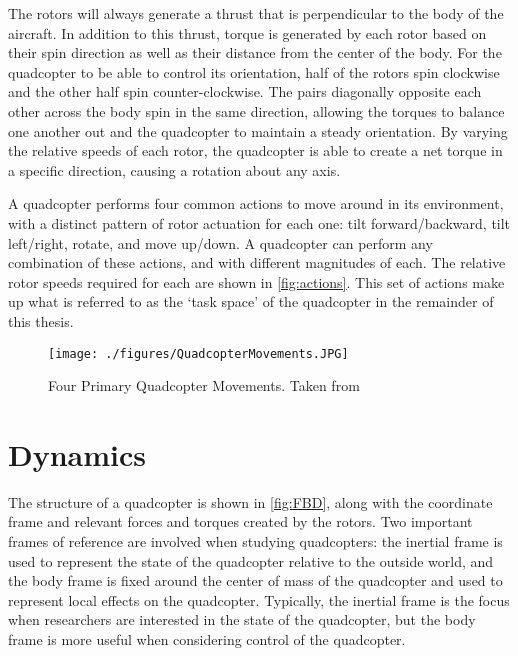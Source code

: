 \documentclass[letterpaper,12pt,titlepage,oneside,final]{book}
\begin{document}
The rotors will always generate a thrust that is perpendicular to the body of the aircraft. 
In addition to this thrust, torque is generated by each rotor based on their spin direction  as well as their distance from the center of the body.
For the quadcopter to be able to control its orientation, half of the rotors spin clockwise and the other half spin counter-clockwise. 
The pairs diagonally opposite each other across the body spin in the same direction, allowing the torques to balance one another out and the quadcopter to maintain a steady orientation. 
By varying the relative speeds of each rotor, the quadcopter is able to create a net torque in a specific direction, causing a rotation about any axis.

A quadcopter performs four common actions to move around in its environment, with a distinct pattern of rotor actuation for each one: 
tilt forward/backward, tilt left/right, rotate, and move up/down. 
A quadcopter can perform any combination of these actions, and with different magnitudes of each. The relative rotor speeds required for each are shown in \autoref{fig:actions}. This set of actions make up what is referred to as the `task space' of the quadcopter in the remainder of this thesis.

\begin{figure}
\centering
\texttt{[image: ./figures/QuadcopterMovements.JPG]}
\caption{Four Primary Quadcopter Movements. Taken from \cite{harsha}}
\label{fig:actions}
\end{figure}


\section{Dynamics} \label{sec:dynamics}


The structure of a quadcopter is shown in \autoref{fig:FBD}, along with the coordinate frame and relevant forces and torques created by the rotors.
Two important frames of reference are involved when studying quadcopters: the inertial frame is used to represent the state of the quadcopter relative to the outside world, and the body frame is fixed around the center of mass of the quadcopter and used to represent local effects on the quadcopter.
Typically, the inertial frame is the focus when researchers are interested in the state of the quadcopter, but the body frame is more useful when considering control of the quadcopter.
\end{document}
